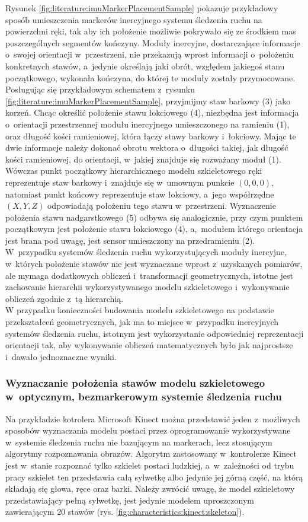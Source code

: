 Rysunek \ref{fig:literature:imuMarkerPlacementSample} pokazuje przykładowy sposób umieszczenia markerów inercyjnego systemu śledzenia ruchu na powierzchni ręki, tak aby ich położenie możliwie pokrywało się ze środkiem mas poszczególnych segmentów kończyny. Moduły inercyjne, dostarczające informacje o~swojej orientacji w~przestrzeni, nie przekazują wprost informacji o~położeniu konkretnych stawów, a~jedynie określają jaki obrót, względem jakiegoś stanu początkowego, wykonała kończyna, do której te moduły zostały przymocowane. Posługując się przykładowym schematem z~rysunku \ref{fig:literature:imuMarkerPlacementSample}, przyjmijmy staw barkowy (3) jako korzeń. Chcąc określić położenie stawu łokciowego (4), niezbędna jest informacja o~orientacji przestrzennej modułu inercyjnego umieszczonego na ramieniu (1), oraz długość kości ramieniowej, która łączy stawy barkowy i~łokciowy. Mając te dwie informacje należy dokonać obrotu wektora o~długości takiej, jak długość kości ramieniowej, do orientacji, w~jakiej znajduje się rozważany moduł (1). Wówczas punkt początkowy hierarchicznego modelu szkieletowego ręki reprezentuje staw barkowy i~znajduje się w~umownym punkcie $(0 , 0 , 0)$, natomiast punkt końcowy reprezentuje staw łokciowy, a~jego współrzędne $(X , Y , Z)$ odpowiadają położeniu tego stawu w~przestrzeni. Wyznaczenie położenia stawu nadgarstkowego (5) odbywa się analogicznie, przy czym punktem początkowym jest położenie stawu łokciowego (4), a,~modułem którego orientacja jest brana pod uwagę, jest sensor umieszczony na przedramieniu (2). W~przypadku systemów śledzenia ruchu wykorzystujących moduły inercyjne, w~których położenie stawów nie jest wyznaczane wprost z~uzyskanych pomiarów, ale mymaga dodatkowych obliczeń i~transformacji geometrycznych, istotne jest zachowanie hierarchii wykorzystywanego modelu szkieletowego i~wykonywanie obliczeń zgodnie z~tą hierarchią.\\
W przypadku konieczności budowania modelu szkieletowego na podstawie przekształceń geometrycznych, jak ma to miejsce w~przypadku inercyjnych systemów śledzenia ruchu, istotnym jest wykorzystanie odpowiedniej reprezentacji orientacji tak, aby wykonywanie obliczeń matematycznych było jak najprostsze i~dawało jednoznaczne wyniki.
																							
\subsubsection*{Wyznaczanie położenia stawów modelu szkieletowego w~optycznym, bezmarkerowym systemie śledzenia ruchu}\label{chap:humanModel:kinect}
Na przykładzie kotrolera Microsoft Kinect można przedstawić jeden z~możliwych sposobów wyznaczania modelu postaci przez oprogramowanie wykorzystywane w~systemie śledzenia ruchu nie bazującym na markerach, lecz stosującym algorytmy rozpoznawania obrazów. Algorytm zastosowany w~kontrolerze Kinect jest w~stanie rozpoznać tylko szkielet postaci ludzkiej, a~w~zależności od trybu pracy szkielet ten przedstawia całą sylwetkę albo jedynie jej górną część, na którą składają się głowa, ręce oraz barki. Należy zwrócić uwagę, że model szkieletowy przedstawiający pełną sylwetkę, jest jedynie modelem uproszczonym zawierającym 20 stawów (rys. \ref{fig:characteristics:kinect:skeleton}).
																							

